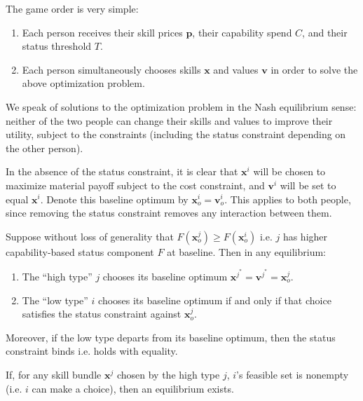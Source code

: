 \documentclass[../../../main.tex]{subfiles}
\begin{document}
\begin{definition}
    The game order is very simple:
    \begin{enumerate}
        \item Each person receives their skill prices $\mathbf{p}$, their capability spend $C$, and their status threshold $T$.
        \item Each person simultaneously chooses skills $\mathbf{x}$ and values $\mathbf{v}$ in order to solve the above optimization problem.
    \end{enumerate}

    We speak of solutions to the optimization problem in the Nash equilibrium sense: neither of the two people can change their skills and values to improve their utility, subject to the constraints (including the status constraint depending on the other person).
\end{definition}

\begin{remark}
    In the absence of the status constraint, it is clear that $\mathbf{x}^i$ will be chosen to maximize material payoff subject to the cost constraint, and $\mathbf{v}^i$ will be set to equal $\mathbf{x}^i$.
    Denote this baseline optimum by $\mathbf{x}^i_o=\mathbf{v}^i_o$. 
    This applies to both people, since removing the status constraint removes any interaction between them.
\end{remark}

\begin{proposition}
    Suppose without loss of generality that $F(\mathbf{x}^j_o)\geq F(\mathbf{x}^i_o)$ i.e. $j$ has higher capability-based status component $F$ at baseline.
    Then in any equilibrium:
    \begin{enumerate}
        \item The ``high type'' $j$ chooses its baseline optimum $\mathbf{x}^{j^*}=\mathbf{v}^{j^*}=\mathbf{x}^j_o$.
        \item The ``low type'' $i$ chooses its baseline optimum if and only if that choice satisfies the status constraint against $\mathbf{x}^{j}_o$.
    \end{enumerate}
    Moreover, if the low type departs from its baseline optimum, then the status constraint binds i.e. holds with equality.
\end{proposition}

\begin{proposition}
    If, for any skill bundle $\mathbf{x}^j$ chosen by the high type $j$, $i$'s feasible set is nonempty (i.e. $i$ can make a choice), then an equilibrium exists.
\end{proposition}
\end{document}
